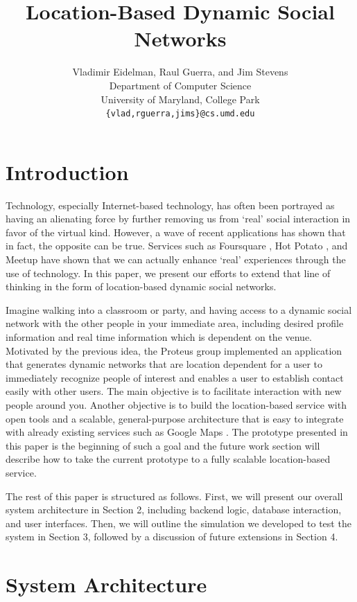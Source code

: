 \documentclass[11pt]{article}
\title{Location-Based Dynamic Social Networks}
\author{
   Vladimir Eidelman, Raul Guerra, and Jim Stevens\\
Department of Computer Science \\
University of Maryland, College Park\\
 { \tt \{vlad,rguerra,jims\}@cs.umd.edu}
}
\begin{document}
\maketitle 

\section{Introduction}


Technology, especially Internet-based technology, has often been portrayed
as having an alienating force by further removing us from `real' social
interaction in favor of the virtual kind. However, a wave of recent
applications has shown that in fact, the opposite can be true. Services
such as Foursquare \cite{foursquare}, Hot Potato \cite{hotp}, and Meetup \cite{meetup} have
shown that we can actually enhance `real' experiences through the use
of technology. In this paper, we present our efforts to extend that line
of thinking in the form of location-based dynamic social networks.

Imagine walking into a classroom or party, and having access to a
dynamic social network with the other people in your immediate area,
including desired profile information and real time information which
is dependent on the venue. Motivated by the previous idea, the Proteus
group implemented an application that generates dynamic networks that are
location dependent for a user to immediately recognize people of interest
and enables a user to establish contact easily with other users. The
main objective is to facilitate interaction with new people around you.
Another objective is to build the location-based service with open tools
and a scalable, general-purpose architecture that is easy to integrate
with already existing services such as Google Maps \cite{google}.
The prototype presented in this paper is the beginning of such a goal and
the future work section will describe how to take the current prototype
to a fully scalable location-based service.

The rest of this paper is structured as follows. First, we will present
our overall system architecture in Section 2, including backend logic,
database interaction, and user interfaces. Then, we will outline the
simulation we developed to test the system in Section 3, followed by a
discussion of future extensions in Section 4.


\section{System Architecture}
\end{document}
